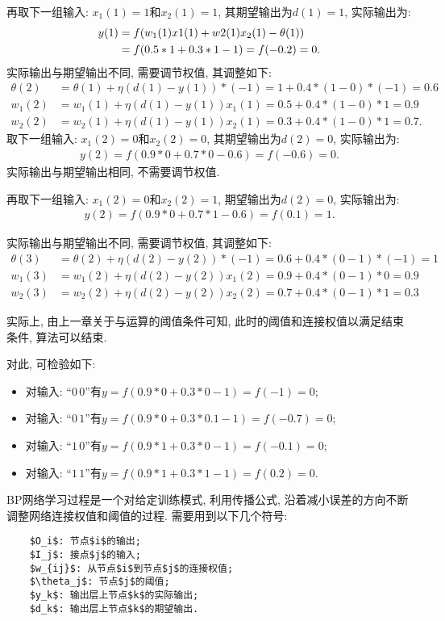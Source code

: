 再取下一组输入: $x_1(1)=1$和$x_2(1)=1$, 其期望输出为$d(1)=1$, 实际输出为:
\begin{align}
  y(1)&=f(w_1(1) x1(1)+ w2(1) x_2(1)-\theta(1))\notag\\
      &=f(0.5*1+0.3*1-1)=f(-0.2)=0.
\end{align}
实际输出与期望输出不同, 需要调节权值, 其调整如下:
\begin{align}
\theta(2)&=\theta(1)+\eta (d(1)- y(1))*(-1)=1+0.4*(1-0)*(-1)=0.6\\
w_1(2)&=w_1(1)+\eta (d(1)- y(1))x_1(1)=0.5+0.4*(1-0)*1=0.9\\
w_2(2)&=w_2(1)+\eta (d(1)- y(1))x_2(1)=0.3+0.4*(1-0)*1=0.7.
\end{align}
取下一组输入: $x_1(2)=0$和$x_2(2)=0$, 其期望输出为$d(2)=0$, 实际输出为:
\begin{align}
  y(2)=f(0.9*0+0.7*0-0.6)=f(-0.6)=0.
\end{align}
实际输出与期望输出相同, 不需要调节权值.

再取下一组输入: $x_1(2)=0$和$x_2(2)=1$, 期望输出为$d(2)=0$, 实际输出为:
\begin{align}
  y(2)=f(0.9*0+0.7*1-0.6)=f(0.1)=1.
\end{align}

实际输出与期望输出不同, 需要调节权值, 其调整如下:
\begin{align}
\theta(3)&=\theta(2)+\eta (d(2)- y(2))*(-1)=0.6+0.4*(0-1)*(-1)=1\\
w_1(3)&=w_1(2)+\eta (d(2)- y(2))x_1(2)=0.9+0.4*(0-1)*0=0.9\\
w_2(3)&=w_2(2)+\eta (d(2)- y(2))x_2(2)=0.7+0.4*(0-1)*1=0.3
\end{align}

实际上, 由上一章关于与运算的阈值条件可知, 此时的阈值和连接权值以满足结束条件, 算法可以结束.

对此, 可检验如下:
\begin{itemize}
\item 对输入: “$0\, 0$”有$y=f(0.9*0+0.3*0-1)=f(-1)=0$;
\item 对输入: “$0\, 1$”有$y=f(0.9*0+0.3*0.1-1)=f(-0.7)=0$;
\item 对输入: “$1\, 0$”有$y=f(0.9*1+0.3*0-1)=f(-0.1)=0$;
\item 对输入: “$1\, 1$”有$y=f(0.9*1+0.3*1-1)=f(0.2)=0$.
\end{itemize}

BP网络学习过程是一个对给定训练模式, 利用传播公式, 沿着减小误差的方向不断调整网络连接权值和阈值的过程. 需要用到以下几个符号:
\begin{Verbatim}
    $O_i$: 节点$i$的输出;
    $I_j$: 接点$j$的输入;
    $w_{ij}$: 从节点$i$到节点$j$的连接权值;
    $\theta_j$: 节点$j$的阈值;
    $y_k$: 输出层上节点$k$的实际输出;
    $d_k$: 输出层上节点$k$的期望输出.
\end{Verbatim}

